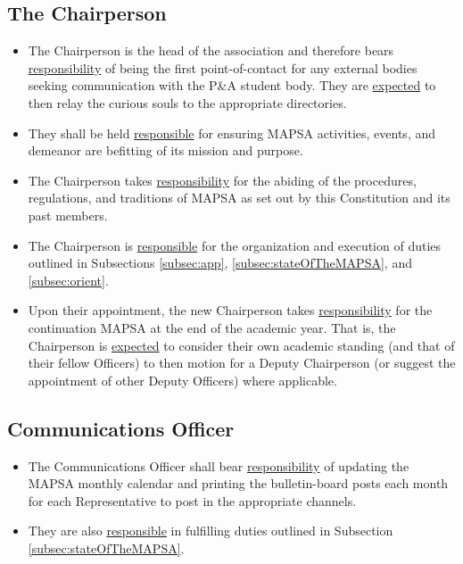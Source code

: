\documentclass[8pt]{article}
\begin{document}
	\subsection{The Chairperson}
	\begin{itemize}
		\item The Chairperson is the head of the association and therefore bears \underline{responsibility} of being the first point-of-contact for any external bodies seeking communication with the P\&A student body. They are \underline{expected} to then relay the curious souls to the appropriate directories. 
		\item They shall be held \underline{responsible} for ensuring MAPSA activities, events, and demeanor are befitting of its mission and purpose. 
		\item The Chairperson takes \underline{responsibility} for the abiding of the procedures, regulations, and traditions of MAPSA as set out by this Constitution and its past members.
		\item The Chairperson is \underline{responsible} for the organization and execution of duties outlined in Subsections \ref{subsec:app}, \ref{subsec:stateOfTheMAPSA}, and \ref{subsec:orient}.
		\item Upon their appointment, the new Chairperson takes \underline{responsibility} for the continuation MAPSA at the end of the academic year. That is, the Chairperson is \underline{expected} to consider their own academic standing (and that of their fellow Officers) to then motion for a Deputy Chairperson (or suggest the appointment of other Deputy Officers) where applicable.
	\end{itemize}
	\subsection{Communications Officer}
	\begin{itemize}
		\item The Communications Officer shall bear \underline{responsibility} of updating the MAPSA monthly calendar and printing the bulletin-board posts each month for each Representative to post in the appropriate channels.
		\item They are also \underline{responsible} in fulfilling duties outlined in Subsection \ref{subsec:stateOfTheMAPSA}.
	\end{itemize}
\end{document}
